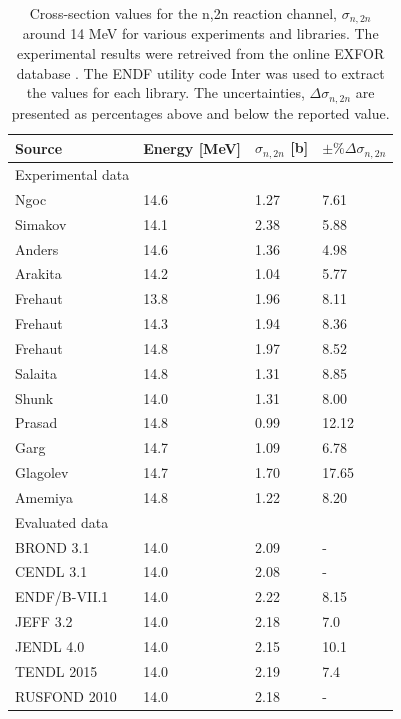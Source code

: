 \begin{table}[H]
  \footnotesize
  \centering
  \begin{tabularx}{\textwidth}{XXXX}
    \toprule
    Source & Energy [MeV] & $\sigma_{n,2n}$ [b] & $\pm\%\Delta\sigma_{n,2n}$ \\
    \midrule
    Experimental data &      &      &    \\
    \midrule
    Ngoc & 14.6 & 1.27 & 7.61 \\
    Simakov & 14.1 & 2.38 & 5.88 \\
    Anders & 14.6 & 1.36 & 4.98 \\
    Arakita & 14.2 & 1.04 & 5.77 \\
    Frehaut & 13.8 & 1.96 & 8.11 \\
    Frehaut & 14.3 & 1.94 & 8.36 \\
    Frehaut & 14.8 & 1.97 & 8.52 \\
    Salaita & 14.8 & 1.31 & 8.85 \\
    Shunk & 14.0 & 1.31 & 8.00 \\
    Prasad & 14.8 & 0.99 & 12.12 \\
    Garg & 14.7 & 1.09 & 6.78 \\
    Glagolev & 14.7 & 1.70 & 17.65 \\
    Amemiya & 14.8 & 1.22 & 8.20 \\
    \midrule
    Evaluated data &      &      &    \\
    \midrule
    BROND 3.1 & 14.0 & 2.09 & - \\
    CENDL 3.1 & 14.0 & 2.08 & - \\
    ENDF/B-VII.1 & 14.0 & 2.22 & 8.15 \\
    JEFF 3.2 & 14.0 & 2.18 & 7.0 \\
    JENDL 4.0 & 14.0 & 2.15 & 10.1 \\
    TENDL 2015 & 14.0 & 2.19 & 7.4 \\
    RUSFOND 2010 & 14.0 & 2.18 & - \\
    \bottomrule
  \end{tabularx}
  \caption{Cross-section values for the n,2n reaction channel, $\sigma_{n,2n}$ around 14 MeV for various experiments and libraries. The experimental results were retreived from the online EXFOR database \cite{exfor2017}. The ENDF utility code Inter \cite{Dunford2002} was used to extract the values for each library. The uncertainties, $\Delta\sigma_{n,2n}$ are presented as percentages above and below the reported value.}
  \label{tab:lead_by_lib}
\end{table}

